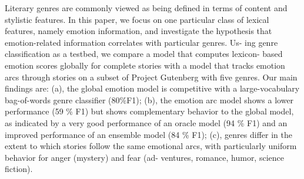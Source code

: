 Literary genres are commonly viewed as being defined in terms of content and stylistic features. In this paper, we focus on one particular class of lexical features, namely emotion information, and investigate the hypothesis that emotion-related information correlates with particular genres. Us- ing genre classification as a testbed, we compare a model that computes lexicon- based emotion scores globally for complete stories with a model that tracks emotion arcs through stories on a subset of Project Gutenberg with five genres. Our main findings are: (a), the global emotion model is competitive with a large-vocabulary bag-of-words genre classifier (80\%F1); (b), the emotion arc model shows a lower performance (59 \% F1) but shows complementary behavior to the global model, as indicated by a very good performance of an oracle model (94 \% F1) and an improved performance of an ensemble model (84 \% F1); (c), genres differ in the extent to which stories follow the same emotional arcs, with particularly uniform behavior for anger (mystery) and fear (ad- ventures, romance, humor, science fiction).
